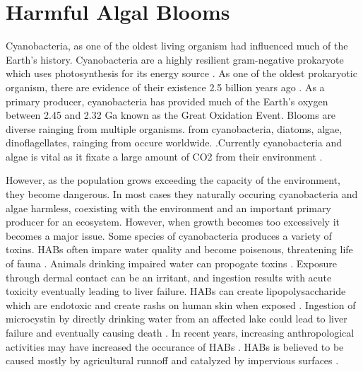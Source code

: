 \documentclass{ou-thesis}
\begin{document}
\section{Harmful Algal Blooms}


Cyanobacteria, as one of the oldest living organism had influenced much of the Earth's history. Cyanobacteria are a highly resilient gram-negative prokaryote which uses photosynthesis for its energy source \cite{rastogi_cyanotoxin-microcystins:_2014}. As one of the oldest prokaryotic organism, there are evidence of their existence 2.5 billion years ago \cite{paerl_moving_2016}. As a primary producer, cyanobacteria has provided much of the Earth's oxygen between 2.45 and 2.32 Ga known as the Great Oxidation Event\cite{farquhar_geological_2011}. Blooms are diverse rainging from multiple organisms.  from cyanobacteria, diatoms, algae, dinoflagellates,  rainging from  occure worldwide.  .Currently cyanobacteria and algae is vital as it fixate a large amount of CO2 from their environment \cite{van_mooy_quorum_2012}.

However, as the population grows exceeding the capacity of the environment, they become dangerous.
In most cases they naturally occuring cyanobacteria and algae harmless, coexisting with the environment and an important primary producer for an ecosystem. However, when growth becomes too excessively it becomes a major issue. Some species of cyanobacteria produces a variety of toxins. HABs often impare water quality and become poisenous, threatening life of fauna \cite{martins_seasonal_2011}. Animals drinking impaired water can propogate toxins  \cite{koreiviene_cyanotoxin_2014}.  Exposure through dermal contact can be an irritant, and ingestion results with acute toxicity eventually leading to liver failure. HABs can create lipopolysaccharide which are endotoxic and create rashs on human skin when exposed \cite{moore_richard_cyanobacterial_1993}. Ingestion of microcystin by directly drinking water from an affected lake could  lead to liver failure and eventually causing death \cite{monks_potent_2007}. In recent years, increasing anthropological activities may have increased the occurance of HABs \cite{paerl_controlling_2011}. HABs is believed to be caused mostly by agricultural runnoff and catalyzed by impervious surfaces \cite{smith_eutrophication_2009}.
\end{document}
